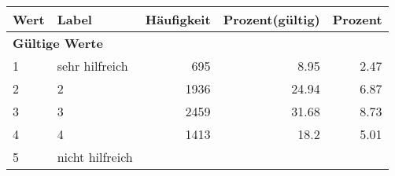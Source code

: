      \begin{longtable}{lXrrr}
     \toprule
     \textbf{Wert} & \textbf{Label} & \textbf{Häufigkeit} & \textbf{Prozent(gültig)} & \textbf{Prozent} \\
     \endhead
     \midrule
     \multicolumn{5}{l}{\textbf{Gültige Werte}}\\

     1 &
     \multicolumn{1}{X}{ sehr hilfreich   } &


       \num{695} &
       \num[round-mode=places,round-precision=2]{8.95} &
         \num[round-mode=places,round-precision=2]{2.47} \\

     2 &
     \multicolumn{1}{X}{ 2   } &


       \num{1936} &
       \num[round-mode=places,round-precision=2]{24.94} &
         \num[round-mode=places,round-precision=2]{6.87} \\

     3 &
     \multicolumn{1}{X}{ 3   } &


       \num{2459} &
       \num[round-mode=places,round-precision=2]{31.68} &
         \num[round-mode=places,round-precision=2]{8.73} \\

     4 &
     \multicolumn{1}{X}{ 4   } &


       \num{1413} &
       \num[round-mode=places,round-precision=2]{18.2} &
         \num[round-mode=places,round-precision=2]{5.01} \\

     5 &
     \multicolumn{1}{X}{ nicht hilfreich   } &



\end{longtable}
